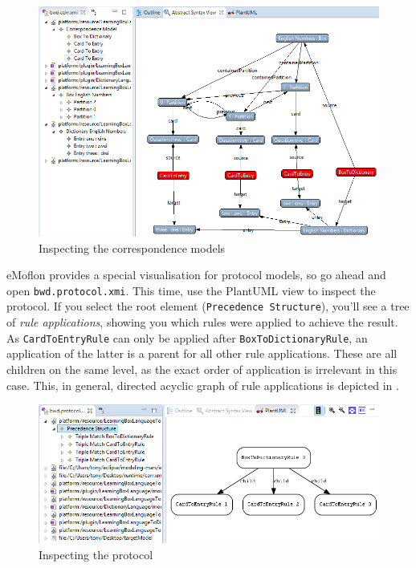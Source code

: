 \begin{stepbystep}
\begin{figure}[htb]
\begin{center}
  \includegraphics[width=\textwidth]{../../org.moflon.doc.handbook.04_tripleGraphTransformations/5_inAction/aImages/eclipse_EngNumBoxGraphView}
  \caption{Inspecting the correspondence models}
  \label{eclipse:graphView}
\end{center}
\end{figure}

\item eMoflon provides a special visualisation for protocol models, so go ahead and open \texttt{bwd.protocol.xmi}.
This time, use the PlantUML view to inspect the protocol.
If you select the root element (\texttt{Precedence Structure}), you'll see a tree of \emph{rule applications}, showing you which rules were applied to achieve the result.
As \texttt{Card\-To\-Entry\-Rule} can only be applied after \texttt{BoxToDictionaryRule}, an application of the latter is a parent for all other rule applications.
These are all children on the same level, as the exact order of application is irrelevant in this case.
This, in general, directed acyclic graph of rule applications is depicted in .
 
\begin{figure}[htb]
\begin{center}
  \includegraphics[width=\textwidth]{../../org.moflon.doc.handbook.04_tripleGraphTransformations/5_inAction/aImages/eclipse_protocol}
  \caption{Inspecting the protocol}
  \label{eclipse_protocol}
\end{center}
\end{figure}


\end{stepbystep}
